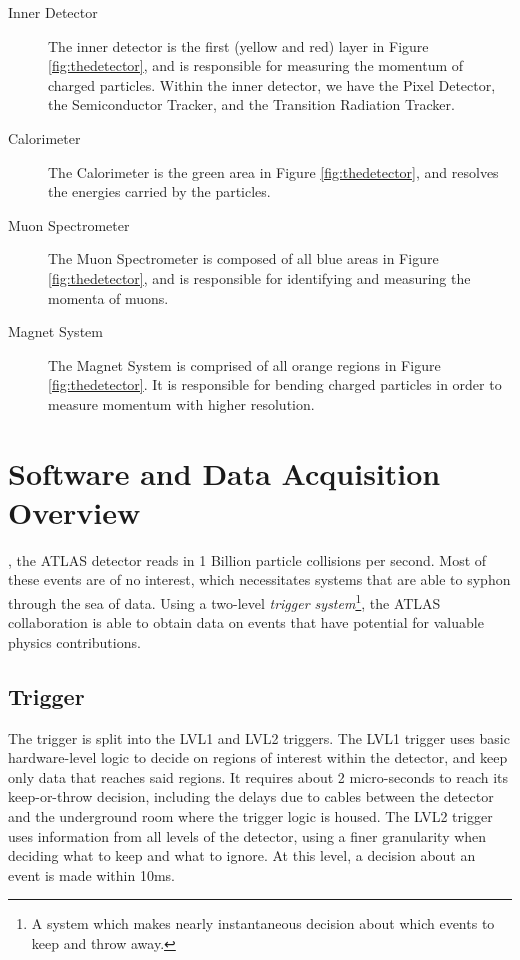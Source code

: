 \begin{description}
	\item[Inner Detector] The inner detector is the first (yellow and red) layer in Figure \ref{fig:thedetector}, and is responsible for measuring the momentum of charged particles. Within the inner detector, we have the Pixel Detector, the Semiconductor Tracker, and the Transition Radiation Tracker.
	
	\item[Calorimeter] The Calorimeter is the green area in Figure \ref{fig:thedetector}, and resolves the energies carried by the particles.
	
	\item[Muon Spectrometer] The Muon Spectrometer is composed of all blue areas in Figure \ref{fig:thedetector}, and is responsible for identifying and measuring the momenta of muons.
	
	\item[Magnet System] The Magnet System is comprised of all orange regions in Figure \ref{fig:thedetector}. It is responsible for bending charged particles in order to measure momentum with higher resolution. 
\end{description}

\section{Software and Data Acquisition Overview}

, the ATLAS detector reads in 1 Billion particle collisions per second. Most of these events are of no interest, which necessitates systems that are able to syphon through the sea of data. Using a two-level \emph{trigger system}\footnote{A system which makes nearly instantaneous decision about which events to keep and throw away.}, the ATLAS collaboration is able to obtain data on events that have potential for valuable physics contributions. 

\subsection{Trigger}

The trigger is split into the LVL1 and LVL2 triggers. The LVL1 trigger uses basic hardware-level logic to decide on regions of interest within the detector, and keep only data that reaches said regions. It requires about 2 micro-seconds to reach its keep-or-throw decision, including the delays due to cables between the detector and the underground room where the trigger logic is housed. The LVL2 trigger uses information from all levels of the detector, using a finer granularity when deciding what to keep and what to ignore. At this level, a decision about an event is made within 10ms.

